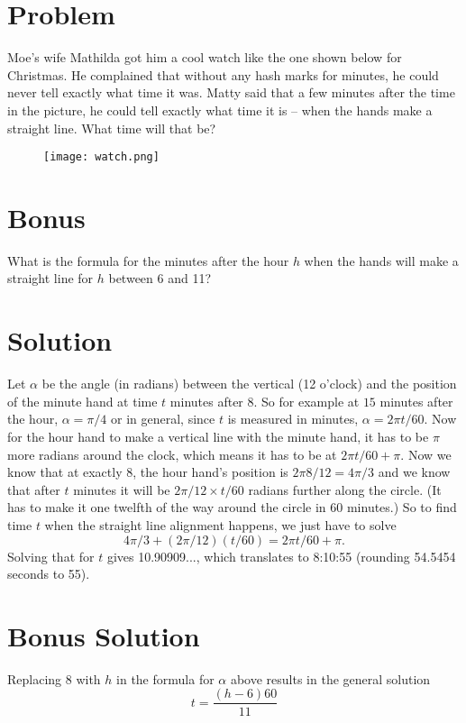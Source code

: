 \documentclass[11pt,a4paper]{report}
\theoremstyle{plain}
\theoremstyle{definition}
\theoremstyle{remark}
\begin{document}
\section*{Problem}
Moe’s wife Mathilda got him a cool watch like the one shown below for Christmas.  He complained that without any hash marks for minutes, he could never tell exactly what time it was.  Matty said that a few minutes after the time in the picture, he could tell exactly what time it is – when the hands make a straight line.  What time will that be?

\begin{figure}[h!]
	\texttt{[image: watch.png]}
	\caption{}
	\label{fig:Moe's Watch}
\end{figure}

\section*{Bonus}
What is the formula for the minutes after the hour $h$ when the hands will make a straight line for $h$ between 6 and 11?

\newpage
\section*{Solution}
Let $\alpha$ be the angle (in radians) between the vertical (12 o'clock) and the position of the minute hand at time $t$ minutes after $8$.  So for example at $15$ minutes after the hour, $\alpha = \pi/4$ or in general, since $t$ is measured in minutes,  $\alpha = 2{\pi}t/60.$  Now for the hour hand to make a vertical line with the minute hand, it has to be $\pi$ more radians around the clock, which means it has to be at $2{\pi}t/60 + \pi.$  Now we know that at exactly $8$, the hour hand's position is $2{\pi}8/12 = 4{\pi}/3$ and we know that after $t$ minutes it will be $2\pi/12 \times t/60$ radians further along the circle.  (It has to make it one twelfth of the way around the circle in 60 minutes.) So to find  time $t$ when the straight line alignment happens, we just have to solve $$4\pi/3 +  (2\pi/12 )(t/60) = 2{\pi}t/60 + \pi.$$  Solving that for $t$ gives 10.90909..., which translates to 8:10:55 (rounding 54.5454 seconds to 55).

\section*{Bonus Solution}
Replacing 8 with $h$ in the formula for $\alpha$ above results in the general solution  $$t = {\dfrac {(h - 6)60}{11}}$$
 
\end{document}
